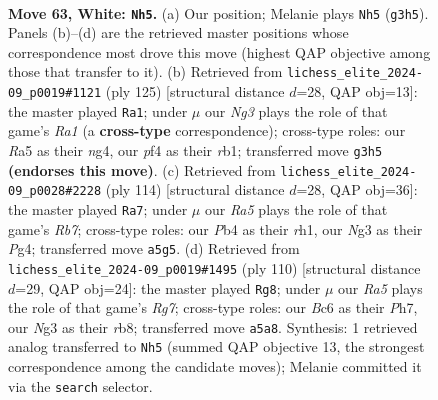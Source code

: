 \documentclass[11pt]{article}
\begin{document}
\clearpage

\begin{figure}[p]\centering
\begin{subfigure}{0.46\textwidth}\centering
\resizebox{\linewidth}{!}{%
\newchessgame
\chessboard[
  setfen={8/8/1kB1r3/R7/1P3p2/6N1/6P1/1K6 w - - 2 63},
  showmover=false,
  pgfstyle=straightmove, color=movearrow, markmove={g3-h5}
]}
\caption{}
\end{subfigure}\hfill
\begin{subfigure}{0.46\textwidth}\centering
\resizebox{\linewidth}{!}{%
\newchessgame
\chessboard[
  setfen={r7/8/6k1/8/6N1/2bK1P2/1p6/1R6 b - - 3 63},
  showmover=false,
  pgfstyle=straightmove, color=movearrow, markmove={a8-a1}
]}
\caption{}
\end{subfigure}
\\[4pt]
\begin{subfigure}{0.46\textwidth}\centering
\resizebox{\linewidth}{!}{%
\newchessgame
\chessboard[
  setfen={8/1RN3p1/2k3p1/8/4K1P1/4P2P/8/7r w - - 1 58},
  showmover=false,
  pgfstyle=straightmove, color=movearrow, markmove={b7-a7}
]}
\caption{}
\end{subfigure}\hfill
\begin{subfigure}{0.46\textwidth}\centering
\resizebox{\linewidth}{!}{%
\newchessgame
\chessboard[
  setfen={1r6/6RP/5P1k/8/p3K3/8/8/8 w - - 0 56},
  showmover=false,
  pgfstyle=straightmove, color=movearrow, markmove={g7-g8}
]}
\caption{}
\end{subfigure}
\caption{\textbf{Move 63, White: \texttt{Nh5}.} (a) Our position; Melanie plays \texttt{Nh5} (\texttt{g3h5}). Panels (b)--(d) are the retrieved master positions whose correspondence most drove this move (highest QAP objective among those that transfer to it). (b) Retrieved from \texttt{lichess\_elite\_2024-09\_p0019\#1121} (ply 125) [structural distance $d$=28, QAP obj=13]: the master played \texttt{Ra1}; under $\mu$ our \emph{Ng3} plays the role of that game's \emph{Ra1} (a \textbf{cross-type} correspondence); cross-type roles: our \emph{R}a5 as their \emph{n}g4, our \emph{p}f4 as their \emph{r}b1; transferred move \texttt{g3h5} \textbf{(endorses this move)}. (c) Retrieved from \texttt{lichess\_elite\_2024-09\_p0028\#2228} (ply 114) [structural distance $d$=28, QAP obj=36]: the master played \texttt{Ra7}; under $\mu$ our \emph{Ra5} plays the role of that game's \emph{Rb7}; cross-type roles: our \emph{P}b4 as their \emph{r}h1, our \emph{N}g3 as their \emph{P}g4; transferred move \texttt{a5g5}. (d) Retrieved from \texttt{lichess\_elite\_2024-09\_p0019\#1495} (ply 110) [structural distance $d$=29, QAP obj=24]: the master played \texttt{Rg8}; under $\mu$ our \emph{Ra5} plays the role of that game's \emph{Rg7}; cross-type roles: our \emph{B}c6 as their \emph{P}h7, our \emph{N}g3 as their \emph{r}b8; transferred move \texttt{a5a8}. Synthesis: 1 retrieved analog transferred to \texttt{Nh5} (summed QAP objective 13, the strongest correspondence among the candidate moves); Melanie committed it via the \texttt{search} selector.}
\label{fig:thought-m124}
\end{figure}
\end{document}
